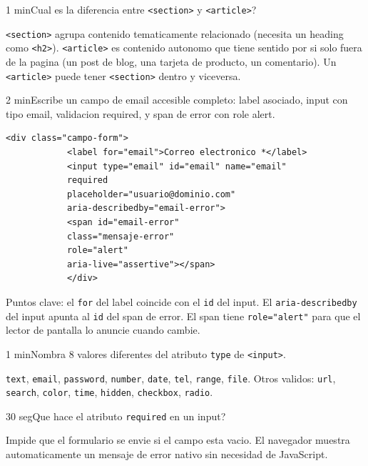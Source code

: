 \documentclass[11pt,a4paper]{article}
\newcounter{nej}
\newcommand{\ej}[2]{%
	\stepcounter{nej}%
	\begin{ejercicio}{\arabic{nej}}{#1}#2\end{ejercicio}\vspace{4pt}}
\begin{document}
	\ej{1 min}{Cual es la diferencia entre \texttt{<section>} y \texttt{<article>}?}
	
	\begin{respuesta}
		\texttt{<section>} agrupa contenido tematicamente relacionado (necesita un heading como \texttt{<h2>}). \texttt{<article>} es contenido autonomo que tiene sentido por si solo fuera de la pagina (un post de blog, una tarjeta de producto, un comentario). Un \texttt{<article>} puede tener \texttt{<section>} dentro y viceversa.
	\end{respuesta}
	\vspace{6pt}
	
	\ej{2 min}{Escribe un campo de email accesible completo: label asociado, input con tipo email, validacion required, y span de error con role alert.}
	
	\begin{respuesta}
		\begin{lstlisting}[style=codehtml]
			<div class="campo-form">
			<label for="email">Correo electronico *</label>
			<input type="email" id="email" name="email"
			required
			placeholder="usuario@dominio.com"
			aria-describedby="email-error">
			<span id="email-error"
			class="mensaje-error"
			role="alert"
			aria-live="assertive"></span>
			</div>
		\end{lstlisting}
		Puntos clave: el \texttt{for} del label coincide con el \texttt{id} del input. El \texttt{aria-describedby} del input apunta al \texttt{id} del span de error. El span tiene \texttt{role="alert"} para que el lector de pantalla lo anuncie cuando cambie.
	\end{respuesta}
	\vspace{6pt}
	
	\ej{1 min}{Nombra 8 valores diferentes del atributo \texttt{type} de \texttt{<input>}.}
	
	\begin{respuesta}
		\texttt{text}, \texttt{email}, \texttt{password}, \texttt{number}, \texttt{date}, \texttt{tel}, \texttt{range}, \texttt{file}. Otros validos: \texttt{url}, \texttt{search}, \texttt{color}, \texttt{time}, \texttt{hidden}, \texttt{checkbox}, \texttt{radio}.
	\end{respuesta}
	\vspace{6pt}
	
	\ej{30 seg}{Que hace el atributo \texttt{required} en un input?}
	
	\begin{respuesta}
		Impide que el formulario se envie si el campo esta vacio. El navegador muestra automaticamente un mensaje de error nativo sin necesidad de JavaScript.
	\end{respuesta}
	\vspace{6pt}
	
\end{document}
